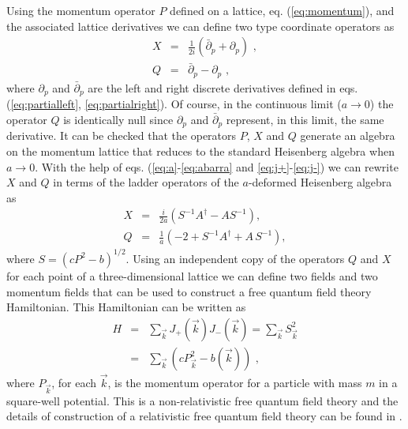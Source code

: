 \documentclass[a4paper,12pt]{article}
\begin{document}
Using the momentum operator $P$ defined
on a lattice, eq. (\ref{eq:momentum}), and the associated lattice 
derivatives we can define two type coordinate operators as
\begin{eqnarray}
    X & = & \frac{1}{2i} (\bar{\partial}_p + \partial_p) \, \, ,
    \label{eq:cord1}  \\
     Q & = &  \bar{\partial}_{p} - \partial_{p} \, \, ,
    \label{eq:cord2}  
\end{eqnarray}
where $\partial_p$ and $\bar{\partial}_p$ are the left and right 
discrete derivatives defined in eqs. (\ref{eq:partialleft}, 
\ref{eq:partialright}). Of course, in the continuous limit
($a\rightarrow 0$)
the operator $Q$ is identically null since $\partial_p$ and 
$\bar{\partial}_p$ represent, in this limit, the same derivative.
It can be checked that the operators $P$, $X$ and $Q$
generate an algebra on the momentum lattice that reduces
to the standard Heisenberg algebra when $a\rightarrow 0$.
With the help of eqs. (\ref{eq:a}-\ref{eq:abarra} and 
\ref{eq:j+}-\ref{eq:j-}) 
we can rewrite $X$ and $Q$ in terms of the ladder
operators of the $a$-deformed Heisenberg algebra as
\begin{eqnarray}
X &=&  \frac{i}{2a} \left( S^{-1} A^{\dagger} - A S^{-1} \right)  ,
\label{eq:cord3} \\
Q &=&  \frac{1}{a} \left( -2 + S^{-1} A^{\dagger} + A \, S^{-1} \right) , 
\label{eq:cord4} 
\end{eqnarray}
where $S=(c P^2 -b)^{1/2}$. Using an independent copy
of the operators $Q$ and $X$ for each point of
a three-dimensional lattice we can define two fields
and two momentum fields that can be used to construct
a free quantum field theory Hamiltonian. This Hamiltonian
can be written as 
\begin{eqnarray}
H &=& \sum_{\vec{k}} 
J_{+}(\vec{k}) J_{-}(\vec{k}) =
\sum_{\vec{k}} S_{\vec{k}}^2  \nonumber \\
&=& 
\sum_{\vec{k}} (c P_{\vec{k}}^2 -b(\vec{k}))  \,\,  ,
\label{eq:resulthamilt}
\end{eqnarray}
where $P_{\vec{k}}$, for each $\vec{k}$, is the momentum operator for a
particle with mass $m$ in a square-well potential. This is a
non-relativistic free quantum field theory and the details of 
construction of a relativistic free quantum field theory
can be found in \cite{qft}.
\end{document}
